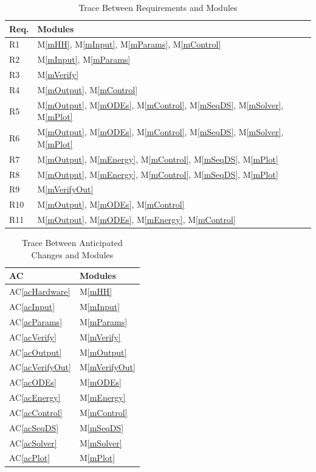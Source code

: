 \documentclass[12pt, titlepage]{article}
\newcommand{\acref}[1]{AC\ref{#1}}
\newcommand{\mref}[1]{M\ref{#1}}
\begin{document}
\begin{table}[H]
\centering
\begin{tabular}{p{} p{}}
\toprule
\textbf{Req.} & \textbf{Modules}\\
\midrule
R1 & \mref{mHH}, \mref{mInput}, \mref{mParams}, \mref{mControl}\\
R2 & \mref{mInput}, \mref{mParams}\\
R3 & \mref{mVerify}\\
R4 & \mref{mOutput}, \mref{mControl}\\
R5 & \mref{mOutput}, \mref{mODEs}, \mref{mControl}, \mref{mSeqDS},
\mref{mSolver}, \mref{mPlot}\\
R6 & \mref{mOutput}, \mref{mODEs}, \mref{mControl}, \mref{mSeqDS},
\mref{mSolver}, \mref{mPlot}\\
R7 & \mref{mOutput}, \mref{mEnergy}, \mref{mControl}, \mref{mSeqDS},
\mref{mPlot}\\
R8 & \mref{mOutput}, \mref{mEnergy}, \mref{mControl}, \mref{mSeqDS},
\mref{mPlot}\\
R9 & \mref{mVerifyOut}\\
R10 & \mref{mOutput}, \mref{mODEs}, \mref{mControl}\\
R11 & \mref{mOutput}, \mref{mODEs}, \mref{mEnergy}, \mref{mControl}\\
\bottomrule
\end{tabular}
\caption{Trace Between Requirements and Modules}
\label{TblRT}
\end{table}

\begin{table}[H]
\centering
\begin{tabular}{p{} p{}}
\toprule
\textbf{AC} & \textbf{Modules}\\
\midrule
\acref{acHardware} & \mref{mHH}\\
\acref{acInput} & \mref{mInput}\\
\acref{acParams} & \mref{mParams}\\
\acref{acVerify} & \mref{mVerify}\\
\acref{acOutput} & \mref{mOutput}\\
\acref{acVerifyOut} & \mref{mVerifyOut}\\
\acref{acODEs} & \mref{mODEs}\\
\acref{acEnergy} & \mref{mEnergy}\\
\acref{acControl} & \mref{mControl}\\
\acref{acSeqDS} & \mref{mSeqDS}\\
\acref{acSolver} & \mref{mSolver}\\
\acref{acPlot} & \mref{mPlot}\\
\bottomrule
\end{tabular}
\caption{Trace Between Anticipated Changes and Modules}
\label{TblACT}
\end{table}
\end{document}
